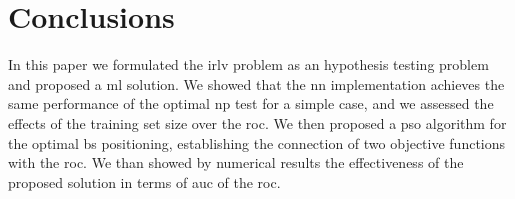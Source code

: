 \documentclass[conference,draftcls,onecolumn]{IEEEtran}
\begin{document}
\section{Conclusions}
\label{sec:conc}

In this paper we formulated the \ac{irlv} problem as an hypothesis testing problem and  proposed a \ac{ml}  solution. We showed that the \ac{nn} implementation achieves the same performance of the optimal  \ac{np} test for a simple case, and we assessed the effects of the training set size over the \ac{roc}. We then proposed a \ac{pso}  algorithm for the  optimal \ac{bs} positioning, establishing the connection of two objective functions with the \ac{roc}. We than showed by numerical results the effectiveness of the proposed solution in terms of \ac{auc} of the \ac{roc}.


\renewcommand*{\bibfont}{\footnotesize}

\printbibliography
\end{document}
